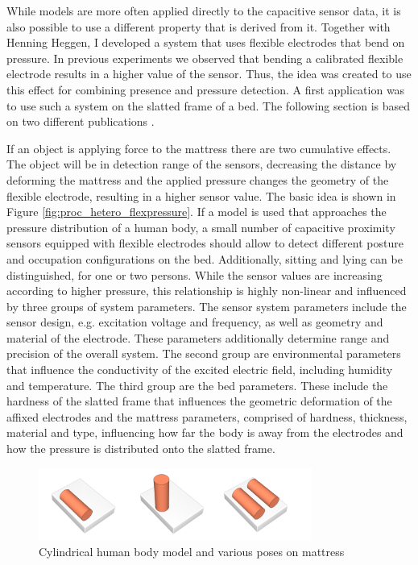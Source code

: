 While models are more often applied directly to the capacitive sensor data, it is also possible to use a different property that is derived from it. Together with Henning Heggen, I developed a system that uses flexible electrodes that bend on pressure. In previous experiments we observed that bending a calibrated flexible electrode results in a higher value of the sensor. Thus, the idea was created to use this effect for combining presence and pressure detection. A first application was to use such a system on the slatted frame of a bed. The following section is based on two different publications \cite{Hamisu2010,braun2012context}. 

If an object is applying force to the mattress there are two cumulative effects. The object will be in detection range of the sensors, decreasing the distance by deforming the mattress and the applied pressure changes the geometry of the flexible electrode, resulting in a higher sensor value. The basic idea is shown in Figure \ref{fig:proc_hetero_flexpressure}. If a model is used that approaches the pressure distribution of a human body, a small number of capacitive proximity sensors equipped with flexible electrodes should allow to detect different posture and occupation configurations on the bed. Additionally, sitting and lying can be distinguished, for one or two persons. While the sensor values are increasing according to higher pressure, this relationship is highly non-linear and influenced by three groups of system parameters. The sensor system parameters include the sensor design, e.g. excitation voltage and frequency, as well as geometry and material of the electrode. These parameters additionally determine range and precision of the overall system. The second group are environmental parameters that influence the conductivity of the excited electric field, including humidity and temperature. The third group are the bed parameters. These include the hardness of the slatted frame that influences the geometric deformation of the affixed electrodes and the mattress parameters, comprised of hardness, thickness, material and type, influencing how far the body is away from the electrodes and how the pressure is distributed onto the slatted frame.

\begin{figure}[ht]
\centering
\includegraphics[width=0.8\textwidth]{images/prot_model_bed}
\caption{Cylindrical human body model and various poses on mattress \cite{braun2012context}}
\label{fig:prot_model_bed}
\end{figure}

